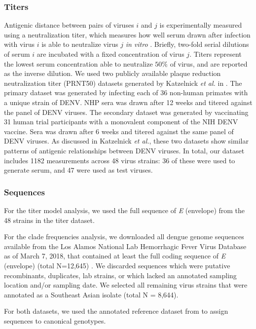 \documentclass[11pt,oneside,letterpaper]{article}
\begin{document}
\subsubsection*{Titers}
Antigenic distance between pairs of viruses $i$ and $j$ is experimentally measured using a neutralization titer, which measures how well serum drawn after infection with virus $i$ is able to neutralize virus $j$ \textit{in vitro} \citep{russell1967dengue}.
Briefly, two-fold serial dilutions of serum $i$ are incubated with a fixed concentration of virus $j$.
Titers represent the lowest serum concentration able to neutralize $50\%$ of virus, and are reported as the inverse dilution.
We used two publicly available plaque reduction neutralization titer (PRNT50) datasets generated by Katzelnick \textit{et al.} in \citep{katzelnick2015dengue}.
The primary dataset was generated by infecting each of 36 non-human primates with a unique strain of DENV.
NHP sera was drawn after 12 weeks and titered against the panel of DENV viruses.
The secondary dataset was generated by vaccinating 31 human trial participants with a monovalent component of the NIH DENV vaccine.
Sera was drawn after 6 weeks and titered against the same panel of DENV viruses.
As discussed in Katzelnick \textit{et al.}, these two datasets show similar patterns of antigenic relationships between DENV viruses.
In total, our dataset includes 1182 measurements across 48 virus strains: 36 of these were used to generate serum, and 47 were used as test viruses.

\subsubsection*{Sequences}
For the titer model analysis, we used the full sequence of \textit{E} (envelope) from the 48 strains in the titer dataset.

For the clade frequencies analysis, we downloaded all dengue genome sequences available from the Los Alamos National Lab Hemorrhagic Fever Virus Database as of March 7, 2018, that contained at least the full coding sequence of \textit{E} (envelope) (total N=12,645) \citep{kuiken2011lanl}.
We discarded sequences which were putative recombinants, duplicates, lab strains, or which lacked an annotated sampling location and/or sampling date.
We selected all remaining virus strains that were annotated as a Southeast Asian isolate (total N = 8,644).

For both datasets, we used the annotated reference dataset from \citep{pyke2016highly} to assign sequences to canonical genotypes.
\end{document}

